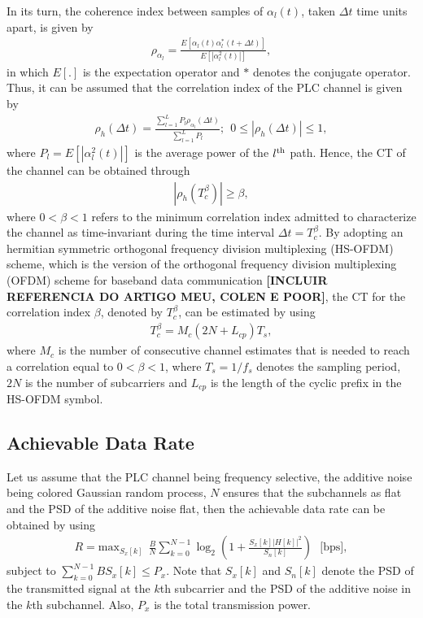 \documentclass[journal]{IEEEtran}
\begin{document}
In its turn, the coherence index between samples of $\alpha_l(t)$, taken $\Delta t$ time units apart, is given by
\begin{eqnarray}\label{eq-correlindex}
\rho_{\alpha_l}=\frac{E[\alpha_l(t)\alpha^*_l(t+\Delta t)]}{E[|\alpha_l^2(t)|]},
\end{eqnarray}
in which $E[.]$ is the expectation operator and $*$ denotes the conjugate operator. 
Thus, it can be assumed that the correlation index of the PLC channel is given by
\begin{eqnarray}\label{eq-correl}
\rho_{h}(\Delta t)=\frac{\sum_{l=1}^L P_l \rho_{\alpha_l}(\Delta t)}{\sum_{l=1}^L P_l}; \ \ 0\leq |\rho_h(\Delta t)|\leq 1,
\end{eqnarray}
where $P_l= E[|\alpha_l^2(t)|]$ is the average power of the  $l^{\rm th}$ path. Hence, the CT of the channel can be obtained through
\begin{eqnarray}\label{eq-correlfinal}
|\rho_h(T_c^{\beta})|\geq \beta,
\end{eqnarray}
where $0 <\beta < 1$ refers to the minimum correlation index admitted to characterize the channel as time-invariant during the time interval $\Delta t =T_c^{\beta}$. By adopting an hermitian symmetric orthogonal frequency division multiplexing (HS-OFDM) scheme, which is the version of the orthogonal frequency division multiplexing (OFDM) scheme for baseband data communication \textbf{ [INCLUIR REFERENCIA DO ARTIGO MEU, COLEN E POOR]}, the CT for the correlation index $\beta$, denoted by $T_{c}^{\beta}$, can be estimated by using~\cite{Picorone2014} 
\begin{eqnarray}
	T_{c}^{\beta} = M_c(2N+L_{cp})T_s,
\end{eqnarray}
where $M_c$ is the number of consecutive channel estimates that is needed to reach a correlation equal to $0<\beta<1$, where
$T_s=1/f_s$ denotes the sampling period, $2N$ is the number of subcarriers and $L_{cp}$ is the length of the cyclic prefix in the HS-OFDM symbol.

\subsection{Achievable Data Rate}

Let us assume that the PLC channel being frequency selective, the additive noise being colored Gaussian random process, $N$ ensures that the subchannels as flat and the \ac{PSD} of the additive noise flat, then the achievable data rate can be obtained by using \cite{Cover2006}
\begin{eqnarray} \label{eq-txMedia}
R = \mbox{max}_{S_x[k]} \ \ \frac{B}{N}\sum_{k=0}^{N-1}\log_2\left(1+ \frac{S_x[k]|H[k]|^2}{S_n[k]}\right)\ \ \ \mbox{[bps]},
\end{eqnarray}
subject to $\sum_{k=0}^{N-1} BS_x[k] \leq P_x$. Note that $S_x[k]$ and  $S_n[k]$ denote the \ac{PSD} of the transmitted signal at the $k$th subcarrier and the \ac{PSD} of the additive noise in the $k$th subchannel. Also, $P_x$ is the total transmission power.
\end{document}
